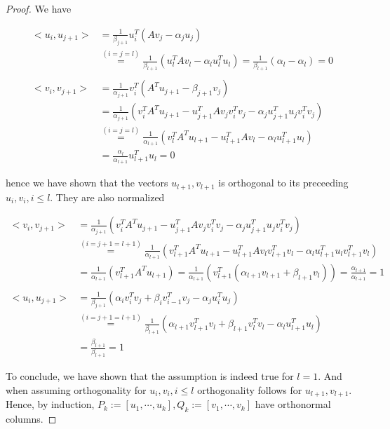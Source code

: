 \documentclass[11pt,a4paper,english]{elsarticle}%
\begin{document}
\begin{proof}
  We have
  
  \begin{align*}
    <u_i,u_{j+1}> &= \frac{1}{\beta_{j+1}}u_i^T(Av_j - \alpha_j u_j) \\
    &\stackrel{(i = j = l)}{=} \frac{1}{\beta_{l+1}}(u_l^TAv_l - \alpha_l u_l^Tu_l)= \frac{1}{\beta_{l+1}}(\alpha_l - \alpha_l) = 0 \\
    \\
    <v_i,v_{j+1}> &= \frac{1}{\alpha_{j+1}}v_i^T(A^Tu_{j+1} - \beta_{j+1} v_j) \\
    &= \frac{1}{\alpha_{j+1}}(v_i^TA^Tu_{j+1} - u_{j+1}^TAv_jv_i^Tv_j - \alpha_ju_{j+1}^Tu_jv_i^Tv_j)\\
    &\stackrel{(i = j = l)}{=}\frac{1}{\alpha_{l+1}}(v_l^TA^Tu_{l+1} - u_{l+1}^TAv_l - \alpha_lu_{l+1}^Tu_l) \\
    &= \frac{\alpha_l}{\alpha_{l+1}}u_{l+1}^Tu_l = 0
  \end{align*}

  \noindent hence we have shown that the vectors $u_{l+1},v_{l+1}$ is orthogonal to its preceeding $u_i,v_i, i \leq l$. They are also normalized 

\begin{align*}
  <v_i,v_{j+1}> &= \frac{1}{\alpha_{j+1}}(v_i^TA^Tu_{j+1} - u_{j+1}^TAv_jv_i^Tv_j - \alpha_ju_{j+1}^Tu_jv_i^Tv_j)\\
  &\stackrel{(i = j+1 = l+1)}{=} \frac{1}{\alpha_{l+1}}(v_{l+1}^TA^Tu_{l+1} - u_{l+1}^TAv_lv_{l+1}^Tv_l - \alpha_lu_{l+1}^Tu_lv_{l+1}^Tv_l)\\
  &=\frac{1}{\alpha_{l+1}}(v_{l+1}^TA^Tu_{l+1}) =  \frac{1}{\alpha_{l+1}}(v_{l+1}^T(\alpha_{l+1}v_{l+1} + \beta_{l+1}v_l)) = \frac{\alpha_{l+1}}{\alpha_{l+1}} = 1\\
  \\
  <u_i,u_{j+1}> &= \frac{1}{\beta_{j+1}}(\alpha_iv_i^Tv_j + \beta_iv_{i-1}^Tv_j - \alpha_ju_i^Tu_j )\\
  &\stackrel{(i = j+1 = l+1)}{=} \frac{1}{\beta_{l+1}}(\alpha_{l+1}v_{l+1}^Tv_l + \beta_{l+1}v_{l}^Tv_l - \alpha_lu_{l+1}^Tu_l )\\
  &= \frac{\beta_{l+1}}{\beta_{l+1}} = 1
\end{align*}


To conclude, we have shown that the assumption is indeed true for $l = 1$. And when assuming orthogonality for $u_i,v_i, i\leq l$ orthogonality follows for $u_{l+1},v_{l+1}$. Hence, by induction, $P_k := [u_1,\cdots,u_k], Q_k := [v_1,\cdots,v_k]$ have orthonormal columns. 
\end{proof}
\end{document}
